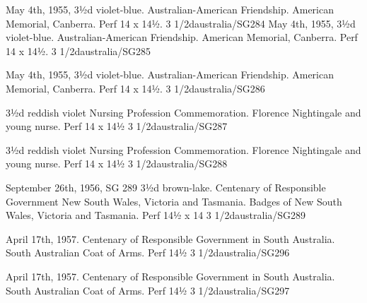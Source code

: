 %
{May 4th, 1955,
3½d violet-blue. Australian-American Friendship. American Memorial, Canberra. Perf 14 x 14½.}%
{3 1/2d}{australia/SG284}{}{}{}{}
%
{May 4th, 1955,
3½d violet-blue. Australian-American Friendship. American Memorial, Canberra. Perf 14 x 14½.}%
{3 1/2d}{australia/SG285}{}{}{}{}


%
{May 4th, 1955,
3½d violet-blue. Australian-American Friendship. American Memorial, Canberra. Perf 14 x 14½.}%
{3 1/2d}{australia/SG286}{}{}{}{}

%
{3½d reddish violet Nursing Profession Commemoration. Florence Nightingale and young nurse. Perf 14 x 14½}%
{3 1/2d}{australia/SG287}{}{}{}{}


%
{3½d reddish violet Nursing Profession Commemoration. Florence Nightingale and young nurse. Perf 14 x 14½}%
{3 1/2d}{australia/SG288}{}{}{}{}

%
{September 26th, 1956, SG 289 3½d brown-lake. Centenary of Responsible Government New South Wales, Victoria and Tasmania. Badges of New South Wales, Victoria and Tasmania. Perf 14½ x 14}%
{3 1/2d}{australia/SG289}{}{}{}{}


%
{April 17th, 1957. Centenary of Responsible Government in South Australia. South Australian Coat of Arms. Perf 14½}%
{3 1/2d}{australia/SG296}{}{}{}{}

%
{April 17th, 1957. Centenary of Responsible Government in South Australia. South Australian Coat of Arms. Perf 14½}%
{3 1/2d}{australia/SG297}{}{}{}{}

